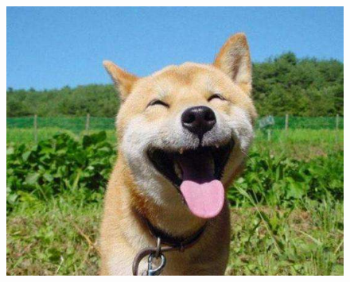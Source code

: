 \documentclass[a4paper,12pt,final,UTF8,fontset=macnew]{memoir}
\begin{document}
\linespread{1.15}\selectfont
\begin{figure}
\centering
	\includegraphics[width=0.8\columnwidth]{dog.jpg}
\vspace{-7cm}
\end{figure}
\end{document}
